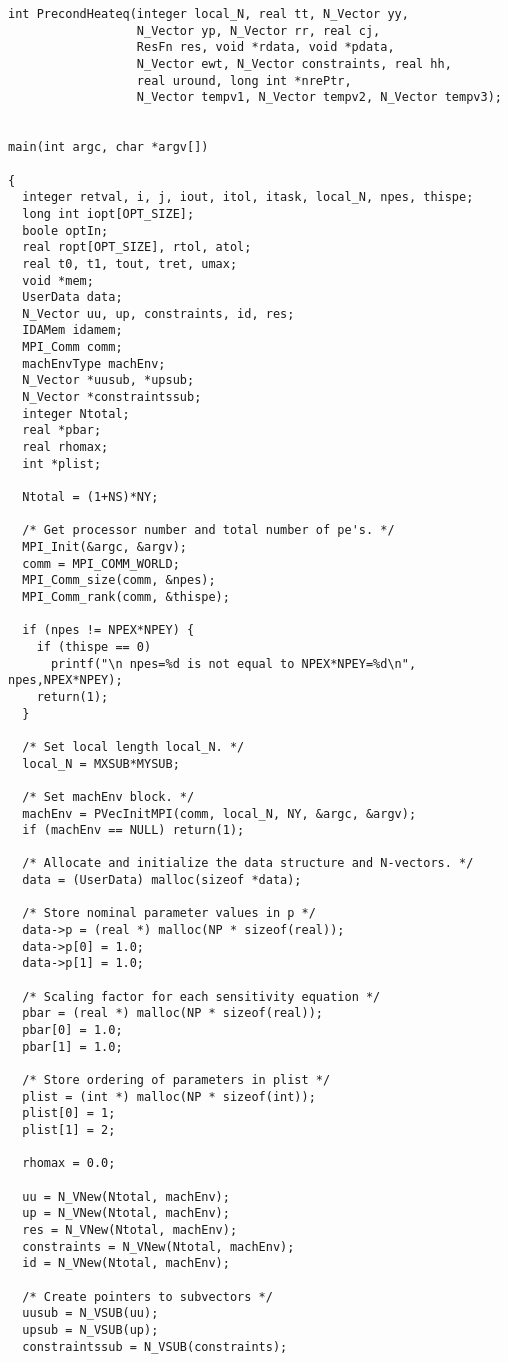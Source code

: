 \begin{verbatim}
int PrecondHeateq(integer local_N, real tt, N_Vector yy,
                  N_Vector yp, N_Vector rr, real cj,
                  ResFn res, void *rdata, void *pdata,
                  N_Vector ewt, N_Vector constraints, real hh, 
                  real uround, long int *nrePtr,
                  N_Vector tempv1, N_Vector tempv2, N_Vector tempv3);


main(int argc, char *argv[])

{
  integer retval, i, j, iout, itol, itask, local_N, npes, thispe;
  long int iopt[OPT_SIZE];
  boole optIn;
  real ropt[OPT_SIZE], rtol, atol;
  real t0, t1, tout, tret, umax;
  void *mem;
  UserData data;
  N_Vector uu, up, constraints, id, res;
  IDAMem idamem;
  MPI_Comm comm;
  machEnvType machEnv;
  N_Vector *uusub, *upsub;
  N_Vector *constraintssub;
  integer Ntotal;
  real *pbar;
  real rhomax;
  int *plist;

  Ntotal = (1+NS)*NY;

  /* Get processor number and total number of pe's. */
  MPI_Init(&argc, &argv);
  comm = MPI_COMM_WORLD;
  MPI_Comm_size(comm, &npes);
  MPI_Comm_rank(comm, &thispe);

  if (npes != NPEX*NPEY) {
    if (thispe == 0)
      printf("\n npes=%d is not equal to NPEX*NPEY=%d\n", npes,NPEX*NPEY);
    return(1);
  }

  /* Set local length local_N. */
  local_N = MXSUB*MYSUB;

  /* Set machEnv block. */
  machEnv = PVecInitMPI(comm, local_N, NY, &argc, &argv);
  if (machEnv == NULL) return(1);

  /* Allocate and initialize the data structure and N-vectors. */
  data = (UserData) malloc(sizeof *data);

  /* Store nominal parameter values in p */
  data->p = (real *) malloc(NP * sizeof(real));
  data->p[0] = 1.0;
  data->p[1] = 1.0;

  /* Scaling factor for each sensitivity equation */
  pbar = (real *) malloc(NP * sizeof(real));
  pbar[0] = 1.0;
  pbar[1] = 1.0;

  /* Store ordering of parameters in plist */
  plist = (int *) malloc(NP * sizeof(int));
  plist[0] = 1;
  plist[1] = 2;

  rhomax = 0.0;

  uu = N_VNew(Ntotal, machEnv); 
  up = N_VNew(Ntotal, machEnv);
  res = N_VNew(Ntotal, machEnv);
  constraints = N_VNew(Ntotal, machEnv);
  id = N_VNew(Ntotal, machEnv);

  /* Create pointers to subvectors */
  uusub = N_VSUB(uu);
  upsub = N_VSUB(up);
  constraintssub = N_VSUB(constraints);


\end{verbatim}
